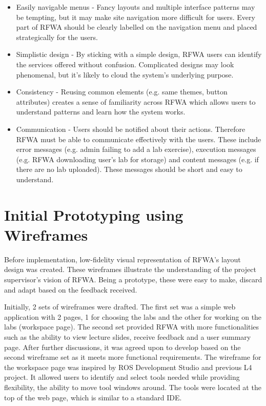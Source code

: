\documentclass{l4proj}
\begin{document}
\begin{itemize}
    \item 
    Easily navigable menus - Fancy layouts and multiple interface patterns may be tempting, but it may make site navigation more difficult for users. Every part of RFWA should be clearly labelled on the navigation menu and placed strategically for the users. 
    \item 
    Simplistic design - By sticking with a simple design, RFWA users can identify the services offered without confusion. Complicated designs may look phenomenal, but it’s likely to cloud the system’s underlying purpose.
    \item 
    Consistency - Reusing common elements (e.g. same themes, button attributes) creates a sense of familiarity across RFWA which allows users to understand patterns and learn how the system works.
    \item 
    Communication - Users should be notified about their actions. Therefore RFWA must be able to communicate effectively with the users. These include error messages (e.g. admin failing to add a lab exercise), execution messages (e.g. RFWA downloading user’s lab for storage) and content messages (e.g. if there are no lab uploaded). These messages should be short and easy to understand.
    
\end{itemize}

\section{Initial Prototyping using Wireframes}
Before implementation, low-fidelity visual representation of RFWA's layout design was created. These wireframes illustrate the understanding of the project supervisor's vision of RFWA. Being a prototype, these were easy to make, discard and adapt based on the feedback received.

Initially, 2 sets of wireframes were drafted. The first set was a simple web application with 2 pages, 1 for choosing the labs and the other for working on the labs (workspace page). The second set provided RFWA with more functionalities such as the ability to view lecture slides, receive feedback and a user summary page. After further discussions, it was agreed upon to develop based on the second wireframe set as it meets more functional requirements. The wireframe for the workspace page was inspired by ROS Development Studio and previous L4 project. It allowed users to identify and select tools needed while providing flexibility, the ability to move tool windows around. The tools were located at the top of the web page, which is similar to a standard IDE. 
\end{document}
